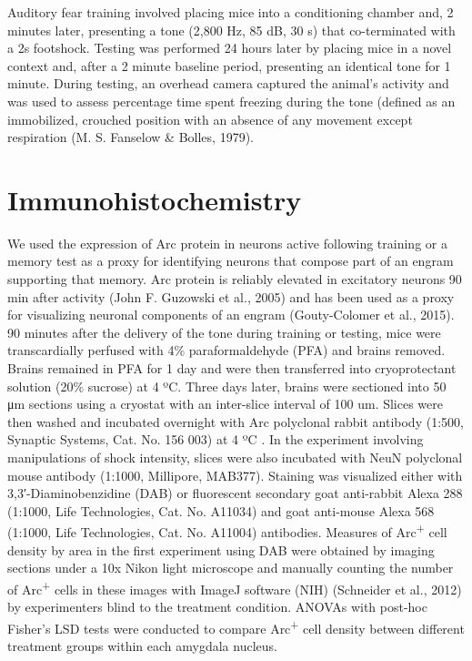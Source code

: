 \documentclass[12pt,a4paperpaper,]{report}
\begin{document}
Auditory fear training involved placing mice into a conditioning chamber
and, 2 minutes later, presenting a tone (2,800 Hz, 85 dB, 30 s) that
co-terminated with a 2s footshock. Testing was performed 24 hours later
by placing mice in a novel context and, after a 2 minute baseline
period, presenting an identical tone for 1 minute. During testing, an
overhead camera captured the animal's activity and was used to assess
percentage time spent freezing during the tone (defined as an
immobilized, crouched position with an absence of any movement except
respiration (M. S. Fanselow \& Bolles, 1979).

\section{Immunohistochemistry}\label{immunohistochemistry}

We used the expression of Arc protein in neurons active following
training or a memory test as a proxy for identifying neurons that
compose part of an engram supporting that memory. Arc protein is
reliably elevated in excitatory neurons 90 min after activity (John F.
Guzowski et al., 2005) and has been used as a proxy for visualizing
neuronal components of an engram (Gouty-Colomer et al., 2015). 90
minutes after the delivery of the tone during training or testing, mice
were transcardially perfused with 4\% paraformaldehyde (PFA) and brains
removed. Brains remained in PFA for 1 day and were then transferred into
cryoprotectant solution (20\% sucrose) at 4 ºC. Three days later, brains
were sectioned into 50 μm sections using a cryostat with an inter-slice
interval of 100 um. Slices were then washed and incubated overnight with
Arc polyclonal rabbit antibody (1:500, Synaptic Systems, Cat. No. 156
003) at 4 ºC . In the experiment involving manipulations of shock
intensity, slices were also incubated with NeuN polyclonal mouse
antibody (1:1000, Millipore, MAB377). Staining was visualized either
with 3,3′-Diaminobenzidine (DAB) or fluorescent secondary goat
anti-rabbit Alexa 288 (1:1000, Life Technologies, Cat. No. A11034) and
goat anti-mouse Alexa 568 (1:1000, Life Technologies, Cat. No. A11004)
antibodies. Measures of Arc\textsuperscript{+} cell density by area in
the first experiment using DAB were obtained by imaging sections under a
10x Nikon light microscope and manually counting the number of
Arc\textsuperscript{+} cells in these images with ImageJ software (NIH)
(Schneider et al., 2012) by experimenters blind to the treatment
condition. ANOVAs with post-hoc Fisher's LSD tests were conducted to
compare Arc\textsuperscript{+} cell density between different treatment
groups within each amygdala nucleus.
\end{document}

